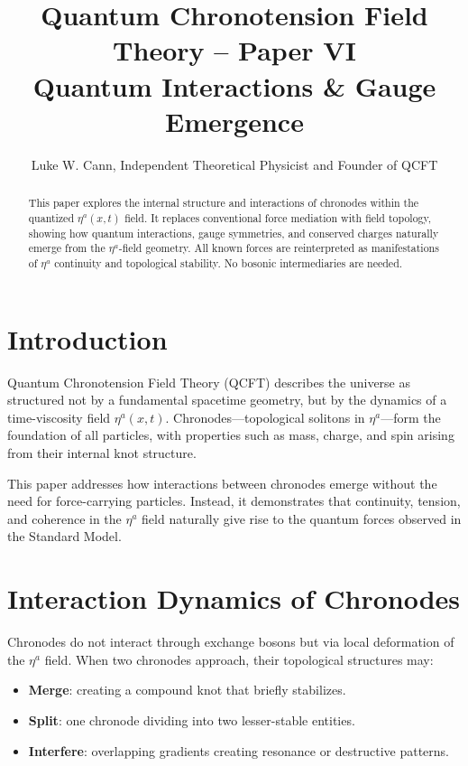\documentclass[12pt]{article}
\title{Quantum Chronotension Field Theory – Paper VI\\\large Quantum Interactions \& Gauge Emergence}
\author{Luke W. Cann, Independent Theoretical Physicist and Founder of QCFT}
\date{}
\begin{document}
\maketitle

\begin{abstract}
This paper explores the internal structure and interactions of chronodes within the quantized $\eta^a(x,t)$ field. It replaces conventional force mediation with field topology, showing how quantum interactions, gauge symmetries, and conserved charges naturally emerge from the $\eta^a$-field geometry. All known forces are reinterpreted as manifestations of $\eta^a$ continuity and topological stability. No bosonic intermediaries are needed.
\end{abstract}

\section{Introduction}

Quantum Chronotension Field Theory (QCFT) describes the universe as structured not by a fundamental spacetime geometry, but by the dynamics of a time-viscosity field $\eta^a(x,t)$. Chronodes---topological solitons in $\eta^a$---form the foundation of all particles, with properties such as mass, charge, and spin arising from their internal knot structure.

This paper addresses how interactions between chronodes emerge without the need for force-carrying particles. Instead, it demonstrates that continuity, tension, and coherence in the $\eta^a$ field naturally give rise to the quantum forces observed in the Standard Model.

\section{Interaction Dynamics of Chronodes}

Chronodes do not interact through exchange bosons but via local deformation of the $\eta^a$ field. When two chronodes approach, their topological structures may:

\begin{itemize}
\item \textbf{Merge}: creating a compound knot that briefly stabilizes.
\item \textbf{Split}: one chronode dividing into two lesser-stable entities.
\item \textbf{Interfere}: overlapping gradients creating resonance or destructive patterns.
\end{itemize}
\end{document}

